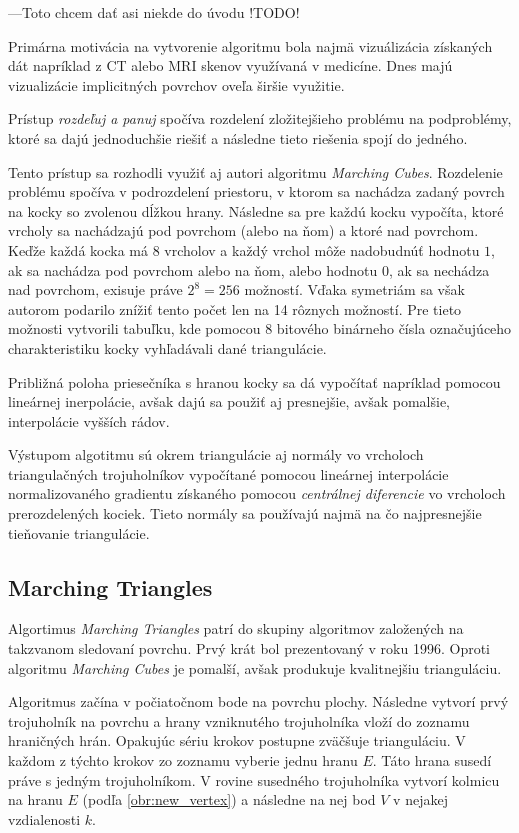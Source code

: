 ---Toto chcem dať asi niekde do úvodu !TODO!


Primárna motivácia na vytvorenie algoritmu bola najmä vizuálizácia získaných dát napríklad z CT alebo MRI skenov 
využívaná v medicíne. Dnes majú vizualizácie implicitných povrchov oveľa širšie využitie.

Prístup \textit{rozdeľuj a panuj} spočíva rozdelení zložitejšieho problému na podproblémy, 
ktoré sa dajú jednoduchšie riešiť a následne tieto riešenia spojí do jedného.

Tento prístup sa rozhodli využiť aj autori algoritmu \textit{Marching Cubes}. Rozdelenie problému
spočíva v podrozdelení priestoru, v ktorom sa nachádza zadaný povrch na kocky so zvolenou dĺžkou
hrany. Následne sa pre každú kocku vypočíta, ktoré vrcholy sa nachádzajú pod povrchom (alebo na ňom) 
a ktoré nad povrchom. Keďže každá kocka má 8 vrcholov a každý vrchol môže nadobudnúť hodnotu $1$, ak sa 
nachádza pod povrchom alebo na ňom, alebo hodnotu $0$, ak sa nechádza nad povrchom, exisuje práve 
$2^8 = 256$ možností. Vďaka symetriám sa však autorom podarilo znížiť tento počet len na 14 rôznych možností.
Pre tieto možnosti vytvorili tabuľku, kde pomocou 8 bitového binárneho čísla označujúceho charakteristiku
kocky vyhľadávali dané triangulácie.

Približná poloha priesečníka s hranou kocky sa dá vypočítať napríklad pomocou lineárnej inerpolácie, avšak 
dajú sa použiť aj presnejšie, avšak pomalšie, interpolácie vyšších rádov.

Výstupom algotitmu sú okrem triangulácie aj normály vo vrcholoch triangulačných trojuholníkov vypočítané pomocou lineárnej
interpolácie normalizovaného gradientu získaného pomocou \textit{centrálnej diferencie} vo vrcholoch prerozdelených kociek. 
Tieto normály sa používajú najmä na čo najpresnejšie tieňovanie triangulácie.


\subsection{Marching Triangles}

Algortimus \textit{Marching Triangles} \cite{hilton1996marching} patrí do skupiny algoritmov založených na takzvanom 
sledovaní povrchu. Prvý krát bol prezentovaný v roku 1996. Oproti algoritmu \textit{Marching Cubes} je pomalší, avšak
produkuje kvalitnejšiu trianguláciu. 

Algoritmus začína v počiatočnom bode na povrchu plochy. Následne vytvorí prvý trojuholník na povrchu a hrany vzniknutého 
trojuholníka vloží do zoznamu hraničných hrán. 
Opakujúc sériu krokov postupne zväčšuje trianguláciu. V každom z týchto krokov zo zoznamu vyberie jednu hranu $E$. 
Táto hrana susedí práve s jedným trojuholníkom. V rovine susedného trojuholníka vytvorí kolmicu na hranu $E$
(podľa \ref{obr:new_vertex}) a následne na nej bod $V$ v nejakej vzdialenosti $k$. 

